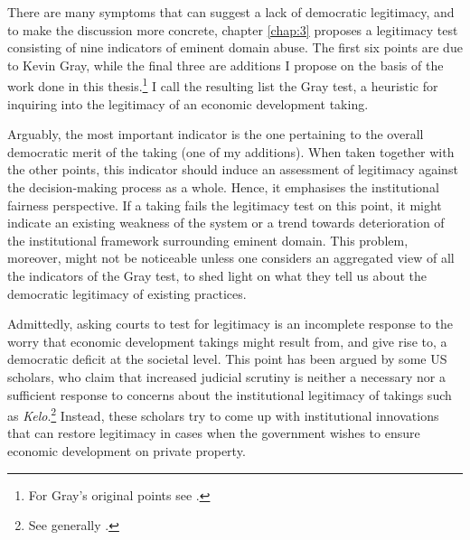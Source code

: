 
There are many symptoms that can suggest a lack of democratic legitimacy, and to make the discussion more concrete, chapter \ref{chap:3} proposes a legitimacy test consisting of nine indicators of eminent domain abuse. The first six points are due to Kevin Gray, while the final three are additions I propose on the basis of the work done in this thesis.\footnote{For Gray's original points see \cite{gray11}.} I call the resulting list the Gray test, a heuristic for inquiring into the legitimacy of an economic development taking. 

Arguably, the most important indicator is the one pertaining to the overall democratic merit of the taking (one of my additions). When taken together with the other points, this indicator should induce an assessment of legitimacy against the decision-making process as a whole. Hence, it emphasises the institutional fairness perspective. If a taking fails the legitimacy test on this point, it might indicate an existing weakness of the system or a trend towards deterioration of the institutional framework surrounding eminent domain. This problem, moreover, might not be noticeable unless one considers an aggregated view of all the indicators of the Gray test, to shed light on what they tell us about the democratic legitimacy of existing practices.

Admittedly, asking courts to test for legitimacy is an incomplete response to the worry that economic development takings might result from, and give rise to, a democratic deficit at the societal level. This point has been argued by some US scholars, who claim that increased judicial scrutiny is neither a necessary nor a sufficient response to concerns about the institutional legitimacy of takings such as {\it Kelo}.\footnote{See generally \cite{lehavi07,heller08}.} Instead, these scholars try to come up with institutional innovations that can restore legitimacy in cases when the government wishes to ensure economic development on private property.

